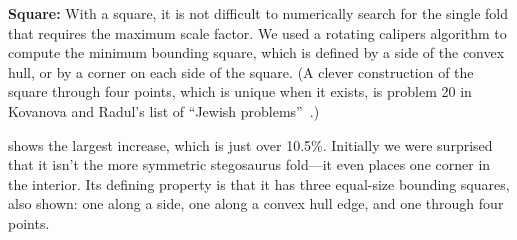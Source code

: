 \documentclass[11pt]{article}
\begin{document}
\begin{figure}[ht] 
\centering
{}\hfil
%
\hfil
%
\end{figure}
%

 {\bf Square:\/}  With a square, it is not difficult to numerically search for the
single fold that requires the maximum scale factor.  We used a
rotating calipers algorithm to compute the minimum bounding square,
which is defined by a side of the convex hull, or by a corner on each
side of the square.  (A clever construction of the square through four
points, which is unique when it exists, is problem 20 in Kovanova and
Radul's list of ``Jewish problems''~\cite{kr-jp-11}.)

  shows the largest increase, which is just over
 10.5\%.  Initially we were surprised that it isn't the more symmetric
 stegosaurus fold---it even places one corner in the interior.  Its
 defining property is that it has three equal-size bounding squares,
 also shown: one along a side, one along a convex hull edge, and one
 through four points.
\end{document}
